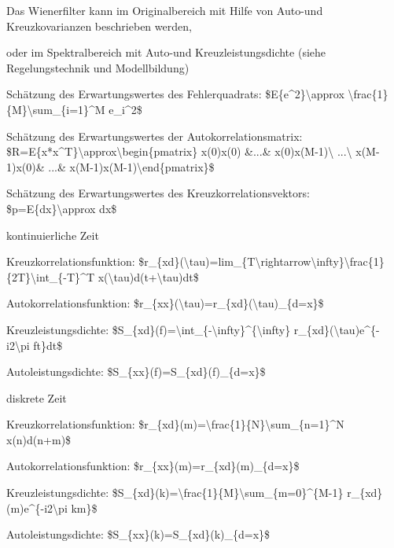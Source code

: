\documentclass[a4paper]{article}
\begin{document}
\begin{multicols}{3}
\begin{itemize*}
    \item Das Wienerfilter kann im Originalbereich mit Hilfe von Auto-und Kreuzkovarianzen beschrieben werden,
    \item oder im Spektralbereich mit Auto-und Kreuzleistungsdichte (siehe Regelungstechnik und Modellbildung)
    \item Schätzung des Erwartungswertes des Fehlerquadrats: \$E\{e\^{}2\}\textbackslash approx \textbackslash frac\{1\}\{M\}\textbackslash sum\_\{i=1\}\^{}M e\_i\^{}2\$
    \item Schätzung des Erwartungswertes der Autokorrelationsmatrix: \$R=E\{x*x\^{}T\}\textbackslash approx\textbackslash begin\{pmatrix\} x(0)x(0) \&...\& x(0)x(M-1)\textbackslash{} ...\textbackslash{} x(M-1)x(0)\& ...\& x(M-1)x(M-1)\textbackslash end\{pmatrix\}\$
    \item Schätzung des Erwartungswertes des Kreuzkorrelationsvektors: \$p=E\{dx\}\textbackslash approx dx\$
    \item kontinuierliche Zeit
    \begin{itemize*}
      \item Kreuzkorrelationsfunktion: \$r\_\{xd\}(\textbackslash tau)=lim\_\{T\textbackslash rightarrow\textbackslash infty\}\textbackslash frac\{1\}\{2T\}\textbackslash int\_\{-T\}\^{}T x(\textbackslash tau)d(t+\textbackslash tau)dt\$
      \item Autokorrelationsfunktion: \$r\_\{xx\}(\textbackslash tau)=r\_\{xd\}(\textbackslash tau)\textbar\_\{d=x\}\$
      \item Kreuzleistungsdichte: \$S\_\{xd\}(f)=\textbackslash int\_\{-\textbackslash infty\}\^{}\{\textbackslash infty\} r\_\{xd\}(\textbackslash tau)e\^{}\{-i2\textbackslash pi ft\}dt\$
      \item Autoleistungsdichte: \$S\_\{xx\}(f)=S\_\{xd\}(f)\textbar\_\{d=x\}\$
    \end{itemize*}
    \item diskrete Zeit
    \begin{itemize*}
      \item Kreuzkorrelationsfunktion: \$r\_\{xd\}(m)=\textbackslash frac\{1\}\{N\}\textbackslash sum\_\{n=1\}\^{}N x(n)d(n+m)\$
      \item Autokorrelationsfunktion: \$r\_\{xx\}(m)=r\_\{xd\}(m)\textbar\_\{d=x\}\$
      \item Kreuzleistungsdichte: \$S\_\{xd\}(k)=\textbackslash frac\{1\}\{M\}\textbackslash sum\_\{m=0\}\^{}\{M-1\} r\_\{xd\}(m)e\^{}\{-i2\textbackslash pi km\}\$
      \item Autoleistungsdichte: \$S\_\{xx\}(k)=S\_\{xd\}(k)\textbar\_\{d=x\}\$
    \end{itemize*}
  \end{itemize*}


\end{multicols}
\end{document}
